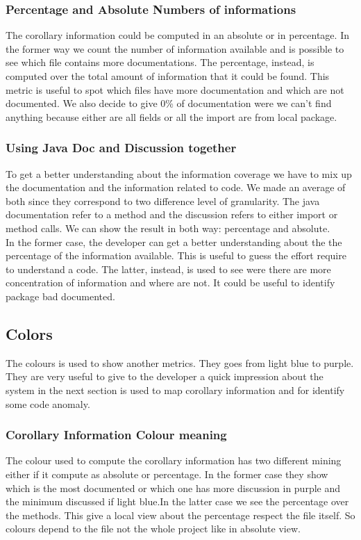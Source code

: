 \documentclass[]{usiinfbachelorproject}
\begin{document}
\subsubsection{Percentage and Absolute Numbers of informations}
The corollary information could be computed in an absolute or in percentage. In the former way we count the number of information available and is possible to see which file contains more documentations. The percentage, instead, is computed over the total amount of information that it could be found. This metric is useful to spot which files have more documentation and which are not documented. We also decide to give 0\% of documentation were we can't find anything because either are all fields or all the import are from local package.

\subsubsection{Using Java Doc and Discussion together}
To get a better understanding about the information coverage we have to mix up the documentation and the information related to code. We made an average of both since they correspond to two difference level of granularity. The java documentation refer to a method and the discussion refers to either import or method calls. We can show the result in both way: percentage and absolute.\\
In the former case, the developer can get a better understanding about the the percentage of the information available. This is useful to guess the effort require to understand a code. The latter, instead, is used to see were there are more concentration of information and where are not. It could be useful to identify package bad documented.
  



\subsection{Colors}
The colours is used to show another metrics. They goes from light blue to purple. They are very useful to give to the developer a quick impression about the system  in the next section is used to map corollary information and for identify some code anomaly.
\subsubsection{Corollary Information Colour meaning}
The colour used to compute the corollary information has two different mining either if it compute as absolute or percentage. In the former case they show which is the most documented or which one has more discussion in purple and the minimum discussed if light blue.In the latter case we see the percentage over the methods. This give a local view about the percentage respect the file itself. So colours depend to the file not the whole project like in absolute view.
\end{document}
